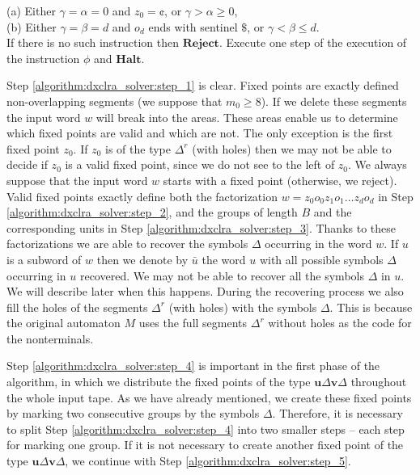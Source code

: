 \begin{algorithm}
\nonl (a) Either $\gamma = \alpha = 0$ and $z_0 = \cent$, or $\gamma > \alpha \ge 0$,\\
\nonl (b) Either $\gamma = \beta = d$ and $o_d$ ends with sentinel $\$$, or $\gamma < \beta \le d$.\\
\nonl If there is no such instruction then $\textbf{Reject}$.\label{algorithm:dxclra_solver:step_7}\;
Execute one step of the execution of the instruction $\phi$ and $\textbf{Halt}$.\label{algorithm:dxclra_solver:step_8}\;
\end{algorithm}

Step \ref{algorithm:dxclra_solver:step_1} is clear. Fixed points are exactly defined non-overlapping segments (we suppose that $m_0 \ge 8$). If we delete these segments the input word $w$ will break into the areas. These areas enable us to determine which fixed points are valid and which are not. The only exception is the first fixed point $z_0$. If $z_0$ is of the type $\Delta^r$ (with holes) then we may not be able to decide if $z_0$ is a valid fixed point, since we do not see to the left of $z_0$. We always suppose that the input word $w$ starts with a fixed point (otherwise, we reject). Valid fixed points exactly define both the factorization $w = z_0 o_0 z_1 o_1 \ldots z_d o_d$ in Step \ref{algorithm:dxclra_solver:step_2}, and the groups of length $B$ and the corresponding units in Step \ref{algorithm:dxclra_solver:step_3}. Thanks to these factorizations we are able to recover the symbols $\Delta$ occurring in the word $w$. If $u$ is a subword of $w$ then we denote by $\bar{u}$ the word $u$ with all possible symbols $\Delta$ occurring in $u$ recovered. We may not be able to recover all the symbols $\Delta$ in $u$. We will describe later when this happens. During the recovering process we also fill the holes of the segments $\Delta^r$ (with holes) with the symbols $\Delta$. This is because the original automaton $M$ uses the full segments $\Delta^r$ without holes as the code for the nonterminals.

Step \ref{algorithm:dxclra_solver:step_4} is important in the first phase of the algorithm, in which we distribute the fixed points of the type $\mathbf{u} \Delta \mathbf{v} \Delta$ throughout the whole input tape. As we have already mentioned, we create these fixed points by marking two consecutive groups by the symbols $\Delta$. Therefore, it is necessary to split Step \ref{algorithm:dxclra_solver:step_4} into two smaller steps -- each step for marking one group. If it is not necessary to create another fixed point of the type $\mathbf{u} \Delta \mathbf{v} \Delta$, we continue with Step \ref{algorithm:dxclra_solver:step_5}.

